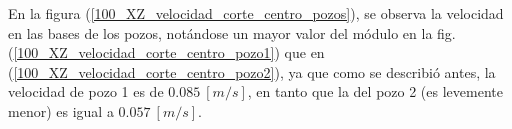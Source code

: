 \documentclass[10pt,a4paper,final]{article}
\begin{document}
%
En la figura (\ref{100_XZ_velocidad_corte_centro_pozos}), se observa la velocidad en las bases de los pozos, notándose un mayor valor del módulo en la fig. (\ref{100_XZ_velocidad_corte_centro_pozo1}) que en (\ref{100_XZ_velocidad_corte_centro_pozo2}), ya que como se describió antes, la velocidad de pozo 1 es de $0.085~[m/s]$, en tanto que la del pozo 2 (es levemente menor) es igual a $0.057~[m/s]$.
%
\begin{figure}[H]
   \centering
   \hspace{0.1\linewidth}

\end{figure}
\end{document}
